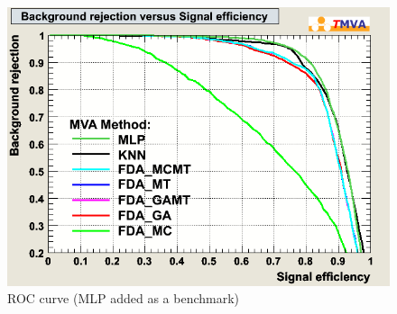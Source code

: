 \begin{figure}[h]
\begin{center}
\includegraphics[width=1.0\textwidth]{images/pkRejBvsS.png}
\caption{ROC curve (MLP added as a benchmark)}
\label{fig:pkRejBvsS}
\end{center}
\end{figure}

\clearpage
